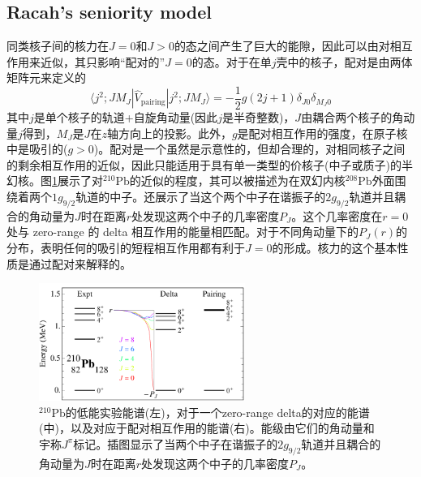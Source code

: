\subsection{Racah's seniority model}

同类核子间的核力在$J=0$和$J>0$的态之间产生了巨大的能隙，因此可以由对相互作用来近似，其只影响“配对的”$J=0$的态。对于在单$j$壳中的核子，配对是由两体矩阵元来定义的
\begin{equation}\label{eq_eq8}
\langle j^2;JM_J|\hat{V}_\textrm{pairing}|j^2;JM_J\rangle=-\frac{1}{2}g(2j+1)\delta_{J0}\delta_{M_J0}
\end{equation}
其中$j$是单个核子的轨道+自旋角动量(因此$j$是半奇整数)，$J$由耦合两个核子的角动量$j$得到，$M_J$是$J$在$z$轴方向上的投影。此外，$g$是配对相互作用的强度，在原子核中是吸引的($g>0$)。配对是一个虽然是示意性的，但却合理的，对相同核子之间的剩余相互作用的近似，因此只能适用于具有单一类型的价核子(中子或质子)的半幻核。图\ref{fig_Pb210}展示了对${}^{210}\textrm{Pb}$的近似的程度，其可以被描述为在双幻内核${}^{208}\textrm{Pb}$外面围绕着两个$1\textit{g}_{9/2}$轨道的中子。还展示了当这个两个中子在谐振子的$2g_{9/2}$轨道并且耦合的角动量为$J$时在距离$r$处发现这两个中子的几率密度$P_J$。这个几率密度在$r=0$处与 zero-range 的 delta 相互作用的能量相匹配。对于不同角动量下的$P_J(r)$的分布，表明任何的吸引的短程相互作用都有利于$J=0$的形成。核力的这个基本性质是通过配对来解释的。
\begin{figure}[H]
\centering
\includegraphics[width=0.6\textwidth]{figure/F_Pb210.png}
\caption{${}^{210}\textrm{Pb}$的低能实验能谱(左)，对于一个zero-range delta的对应的能谱(中)，以及对应于配对相互作用的能谱(右)。能级由它们的角动量和宇称$J^\pi$标记。插图显示了当两个中子在谐振子的$2g_{9/2}$轨道并且耦合的角动量为$J$时在距离$r$处发现这两个中子的几率密度$P_J$。\label{fig_Pb210}}
\end{figure}

